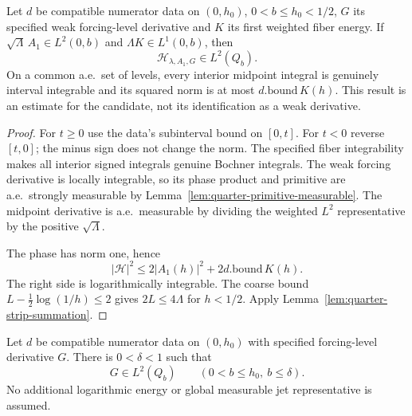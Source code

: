 \begin{lemma}
\label{lem:quarter-reconstruction-level-gain}
\leanok
Let $d$ be compatible numerator data on $(0,h_0)$, $0<b\le h_0<1/2$,
$G$ its specified weak forcing-level derivative and $K$ its first
weighted fiber energy.
If $\sqrt\Lambda\,A_1\in L^2(0,b)$ and $\Lambda K\in L^1(0,b)$, then
\[
 \mathcal H_{\lambda,A_1,G}\in L^2(Q_b).
\]
On a common a.e.\ set of levels, every interior midpoint integral is
genuinely interval integrable and its squared norm is at most
$d.\mathrm{bound}\,K(h)$.
This result is an estimate for the candidate, not its identification
as a weak derivative.
\end{lemma}

\begin{proof}
\leanok
For $t\ge0$ use the data's subinterval bound on $[0,t]$.
For $t<0$ reverse $[t,0]$; the minus sign does not change the norm.
The specified fiber integrability makes all interior signed integrals
genuine Bochner integrals. The weak forcing derivative is locally
integrable, so its phase product and primitive are a.e.\ strongly
measurable by Lemma~\ref{lem:quarter-primitive-measurable}.
The midpoint derivative is a.e.\ measurable by dividing the weighted
$L^2$ representative by the positive $\sqrt\Lambda$.

The phase has norm one, hence
\[
 |\mathcal H|^2\le 2|A_1(h)|^2+2d.\mathrm{bound}\,K(h).
\]
The right side is logarithmically integrable.
The coarse bound $L-\frac12\log(1/h)\le2$ gives $2L\le4\Lambda$ for
$h<1/2$. Apply Lemma~\ref{lem:quarter-strip-summation}.
\end{proof}

\begin{lemma}
\label{lem:quarter-forcing-level-gain}
\leanok
Let $d$ be compatible numerator data on $(0,h_0)$ with specified
forcing-level derivative $G$. There is $0<\delta<1$ such that
\[
 G\in L^2(Q_b)\qquad(0<b\le h_0,\ b\le\delta).
\]
No additional logarithmic energy or global measurable jet
representative is assumed.
\end{lemma}

